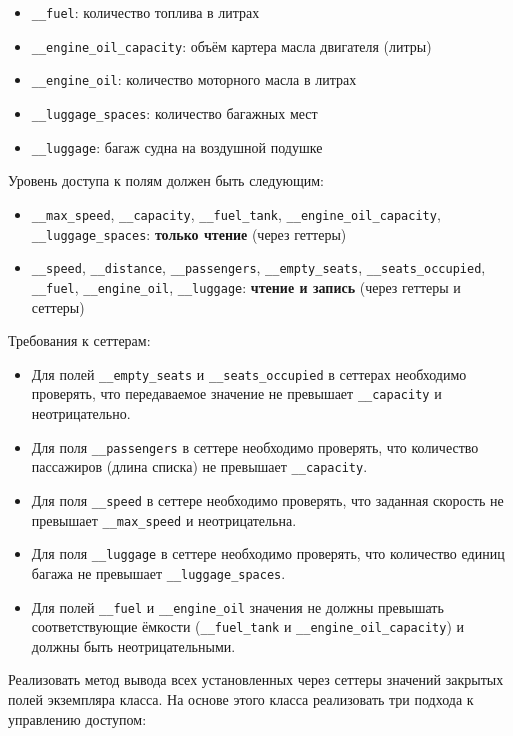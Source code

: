 \begin{enumerate}
\begin{itemize}
    \item \texttt{\_\_fuel}: количество топлива в литрах  
    \item \texttt{\_\_engine\_oil\_capacity}: объём картера масла двигателя (литры)  
    \item \texttt{\_\_engine\_oil}: количество моторного масла в литрах  
    \item \texttt{\_\_luggage\_spaces}: количество багажных мест  
    \item \texttt{\_\_luggage}: багаж судна на воздушной подушке  
\end{itemize}
Уровень доступа к полям должен быть следующим:
\begin{itemize}
    \item \texttt{\_\_max\_speed}, \texttt{\_\_capacity}, \texttt{\_\_fuel\_tank}, \texttt{\_\_engine\_oil\_capacity}, \texttt{\_\_luggage\_spaces}: \textbf{только чтение} (через геттеры)  
    \item \texttt{\_\_speed}, \texttt{\_\_distance}, \texttt{\_\_passengers}, \texttt{\_\_empty\_seats}, \texttt{\_\_seats\_occupied}, \texttt{\_\_fuel}, \texttt{\_\_engine\_oil}, \texttt{\_\_luggage}: \textbf{чтение и запись} (через геттеры и сеттеры)
\end{itemize}
Требования к сеттерам:
\begin{itemize}
    \item Для полей \texttt{\_\_empty\_seats} и \texttt{\_\_seats\_occupied} в сеттерах необходимо проверять, что передаваемое значение не превышает \texttt{\_\_capacity} и неотрицательно.  
    \item Для поля \texttt{\_\_passengers} в сеттере необходимо проверять, что количество пассажиров (длина списка) не превышает \texttt{\_\_capacity}.  
    \item Для поля \texttt{\_\_speed} в сеттере необходимо проверять, что заданная скорость не превышает \texttt{\_\_max\_speed} и неотрицательна.  
    \item Для поля \texttt{\_\_luggage} в сеттере необходимо проверять, что количество единиц багажа не превышает \texttt{\_\_luggage\_spaces}.
    \item Для полей \texttt{\_\_fuel} и \texttt{\_\_engine\_oil} значения не должны превышать соответствующие ёмкости (\texttt{\_\_fuel\_tank} и \texttt{\_\_engine\_oil\_capacity}) и должны быть неотрицательными.
\end{itemize}
Реализовать метод вывода всех установленных через сеттеры значений закрытых полей экземпляра класса.
На основе этого класса реализовать три подхода к управлению доступом:

\end{enumerate}
